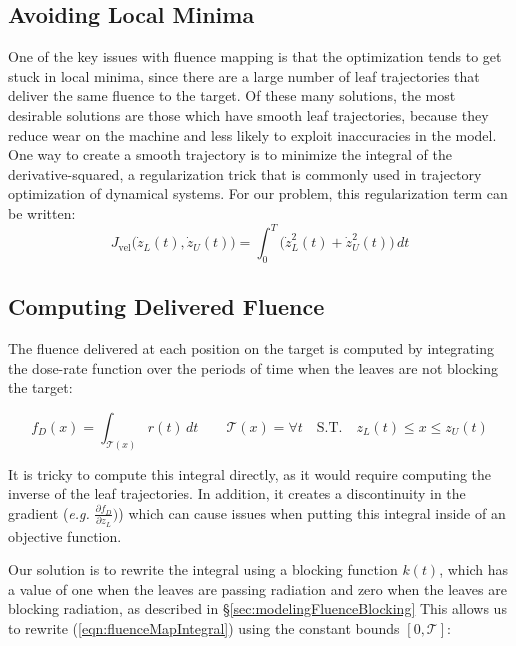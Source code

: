 \subsection{Avoiding Local Minima}

One of the key issues with fluence mapping is that the
optimization tends to get stuck in local minima,
since there are a large number of leaf trajectories that deliver the same fluence to the target.
Of these many solutions, the most desirable solutions are those which have smooth leaf trajectories,
because they reduce wear on the machine and less likely to exploit inaccuracies in the model.
One way to create a smooth trajectory is to minimize the integral of the derivative-squared,
a regularization trick that is commonly used in trajectory optimization of dynamical systems.
For our problem, this regularization term can be written:
\begin{equation}
  J_\text{vel}\big(\dot{z}_L(t), \dot{z}_U(t)\big)
    = \int_0^T \! \big( \dot{z}_L^2(t) + \dot{z}_U^2(t) \big) \,dt
\end{equation}

\subsection{Computing Delivered Fluence}

The fluence delivered at each position on the target is computed by integrating the
dose-rate function over the periods of time when the leaves are not blocking the target:

\begin{equation}
  f_D(x) = \int_{\mathcal{T}(x)} \! r(t) \,dt
  \quad \quad
  \mathcal{T}(x) = \forall t
  \quad
  \text{S.T.}
  \quad
  z_L(t) \leq x \leq z_U(t)
  \label{eqn:fluenceMapIntegral}
\end{equation}

It is tricky to compute this integral directly, as it would require computing
the inverse of the leaf trajectories.
In addition, it creates a discontinuity in the gradient
(\textit{e.g.} $\tfrac{\partial f_D}{\partial z_L})$)
which can cause issues when putting this integral inside of an objective function.

Our solution is to rewrite the integral using a blocking function $k(t)$,
which has a value of one when the leaves are passing radiation and
zero when the leaves are blocking radiation, as described in \S\ref{sec:modelingFluenceBlocking}
This allows us to rewrite (\ref{eqn:fluenceMapIntegral}) using the constant bounds $[0, \mathcal{T}]$:

